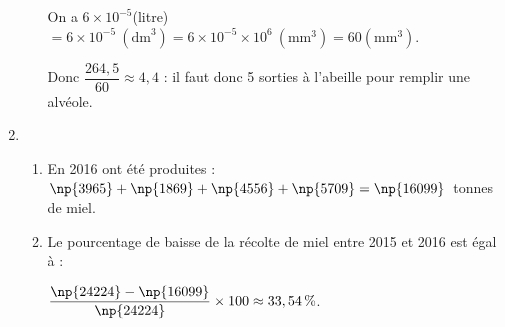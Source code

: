 \begin{enumerate}
\begin{enumerate}
On a $6 \times  10^{-5}$(litre) $= 6 \times  10^{-5}\:\left(\text{dm}^3\right) = 6 \times  10^{-5} \times 10^6\:\left(\text{mm}^3\right) = 60\left(\text{mm}^3\right)$.

Donc $\dfrac{264,5}{60} \approx 4,4$ : il faut donc 5 sorties à l'abeille pour remplir une alvéole.
	\end{enumerate}
\item %


	\begin{enumerate}
		\item %
		En 2016 ont été produites : $\np{3965} + \np{1869} + \np{4556} + \np{5709} = \np{16099}$~tonnes de miel.
		\item %
Le pourcentage de baisse de la récolte de miel entre 2015 et 2016 est égal à :

$\dfrac{\np{24224} - \np{16099}}{\np{24224}} \times 100 \approx 33,54\,\%$.
	\end{enumerate}
\end{enumerate}

\vspace{0,5cm}

